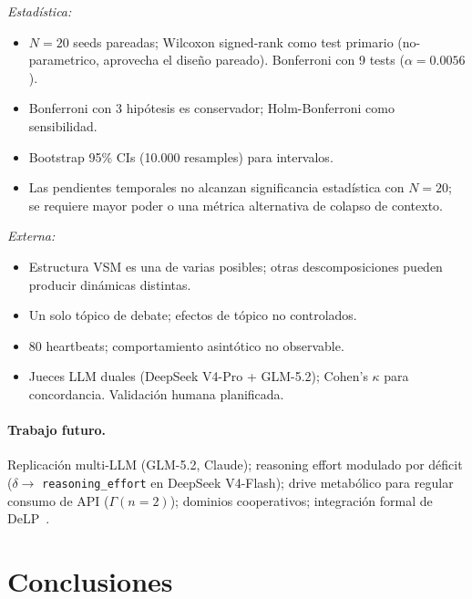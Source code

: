 \documentclass{llncs}
\begin{document}
\textit{Estad\'istica:}
\begin{itemize}[nosep,leftmargin=*]
\item $N{=}20$ seeds pareadas; Wilcoxon signed-rank como test primario
      (no-parametrico, aprovecha el dise\~no pareado). Bonferroni con 9
      tests ($\alpha{=}0.0056$).
\item Bonferroni con 3 hip\'otesis es conservador;
      Holm-Bonferroni como sensibilidad.
\item Bootstrap 95\% CIs (10.000 resamples) para intervalos.
\item Las pendientes temporales no alcanzan significancia estad\'istica
      con $N{=}20$; se requiere mayor poder o una m\'etrica alternativa
      de colapso de contexto.
\end{itemize}

\textit{Externa:}
\begin{itemize}[nosep,leftmargin=*]
\item Estructura VSM es una de varias posibles; otras
      descomposiciones pueden producir din\'amicas distintas.
\item Un solo t\'opico de debate; efectos de t\'opico no controlados.
\item 80 heartbeats; comportamiento asint\'otico no observable.
\item Jueces LLM duales (DeepSeek V4-Pro + GLM-5.2); Cohen's $\kappa$
      para concordancia. Validaci\'on humana planificada.
\end{itemize}

\paragraph{Trabajo futuro.}
Replicaci\'on multi-LLM (GLM-5.2, Claude); reasoning effort modulado por
d\'eficit ($\delta \to$ \texttt{reasoning\_effort} en DeepSeek V4-Flash);
drive metab\'olico para regular consumo de API ($\Gamma(n{=}2)$);
dominios cooperativos; integraci\'on formal de
DeLP~\parencite{garcia2004defeasible}.

\section{Conclusiones}
\label{sec:conclusion}
\end{document}
